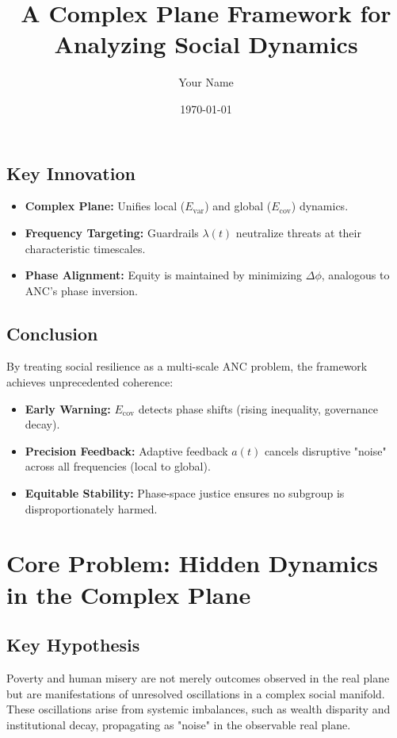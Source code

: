 \documentclass{article}
\theoremstyle{definition}
\begin{document}
\subsection{Key Innovation}
\begin{itemize}
    \item \textbf{Complex Plane:} Unifies local ($E_{\text{var}}$) and global ($E_{\text{cov}}$) dynamics.
    \item \textbf{Frequency Targeting:} Guardrails $\lambda(t)$ neutralize threats at their characteristic timescales.
    \item \textbf{Phase Alignment:} Equity is maintained by minimizing $\Delta \phi$, analogous to ANC’s phase inversion.
\end{itemize}

\subsection{Conclusion}
By treating social resilience as a multi-scale ANC problem, the framework achieves unprecedented coherence:
\begin{itemize}
    \item \textbf{Early Warning:} $E_{\text{cov}}$ detects phase shifts (rising inequality, governance decay).
    \item \textbf{Precision Feedback:} Adaptive feedback $a(t)$ cancels disruptive "noise" across all frequencies (local to global).
    \item \textbf{Equitable Stability:} Phase-space justice ensures no subgroup is disproportionately harmed.
\end{itemize}

\title{A Complex Plane Framework for Analyzing Social Dynamics}
\author{Your Name}
\date{\today}


\maketitle

\section{Core Problem: Hidden Dynamics in the Complex Plane}

\subsection{Key Hypothesis}
Poverty and human misery are not merely outcomes observed in the real plane but are manifestations of unresolved oscillations in a complex social manifold. These oscillations arise from systemic imbalances, such as wealth disparity and institutional decay, propagating as "noise" in the observable real plane.
\end{document}
